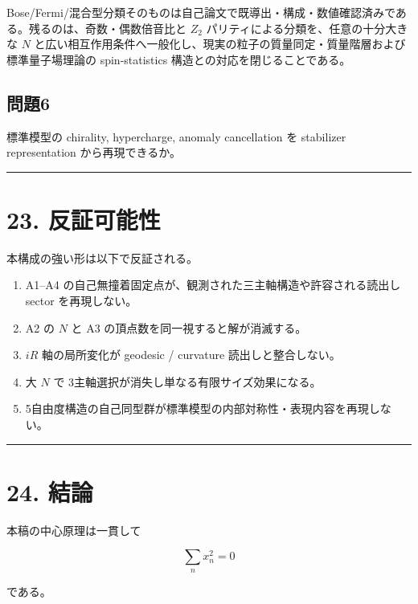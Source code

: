 \documentclass[
  a4paper,
]{ltjsarticle}
\providecommand{\tightlist}{%
  \setlength{\itemsep}{0pt}\setlength{\parskip}{0pt}}
\begin{document}
Bose/Fermi/混合型分類そのものは自己論文で既導出・構成・数値確認済みである。残るのは、奇数・偶数倍音比と
\(Z_2\) パリティによる分類を、任意の十分大きな \(N\)
と広い相互作用条件へ一般化し、現実の粒子の質量同定・質量階層および標準量子場理論の
spin-statistics 構造との対応を閉じることである。

\subsection{問題6}\label{ux554fux984c6}

標準模型の chirality, hypercharge, anomaly cancellation を stabilizer
representation から再現できるか。

\begin{center}\rule{0.5\linewidth}{0.5pt}\end{center}

\section{23. 反証可能性}\label{ux53cdux8a3cux53efux80fdux6027}

本構成の強い形は以下で反証される。

\begin{enumerate}
\def\labelenumi{\arabic{enumi}.}
\tightlist
\item
  A1--A4 の自己無撞着固定点が、観測された三主軸構造や許容される読出し
  sector を再現しない。
\item
  A2 の \(N\) と A3 の頂点数を同一視すると解が消滅する。
\item
  \(iR\) 軸の局所変化が geodesic / curvature 読出しと整合しない。
\item
  大 \(N\) で 3主軸選択が消失し単なる有限サイズ効果になる。
\item
  5自由度構造の自己同型群が標準模型の内部対称性・表現内容を再現しない。
\end{enumerate}

\begin{center}\rule{0.5\linewidth}{0.5pt}\end{center}

\section{24. 結論}\label{ux7d50ux8ad6}

本稿の中心原理は一貫して

\[
\boxed{
\sum_nx_n^2=0
}
\]

である。
\end{document}

